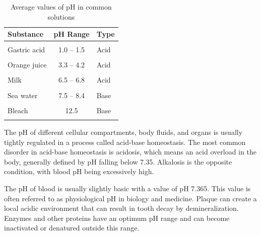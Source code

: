 \documentclass[
]{book}
\begin{document}
\begin{table}[!h]

\caption{\label{tab:solutions}Average values of pH in common solutions}
\centering
\begin{tabular}[t]{lcl}
\toprule
Substance & pH Range & Type\\
\midrule
\cellcolor{gray!6}{Battery acid} & \cellcolor{gray!6}{< 1} & \cellcolor{gray!6}{Acid}\\
Gastric acid & 1.0 – 1.5 & Acid\\
\cellcolor{gray!6}{Vinegar} & \cellcolor{gray!6}{2.5} & \cellcolor{gray!6}{Acid}\\
Orange juice & 3.3 – 4.2 & Acid\\
\cellcolor{gray!6}{Black coffee} & \cellcolor{gray!6}{5 – 5.03} & \cellcolor{gray!6}{Acid}\\
\addlinespace
Milk & 6.5 – 6.8 & Acid\\
\cellcolor{gray!6}{Pure water} & \cellcolor{gray!6}{7} & \cellcolor{gray!6}{Neutral}\\
Sea water & 7.5 – 8.4 & Base\\
\cellcolor{gray!6}{Ammonia} & \cellcolor{gray!6}{11.0 – 11.5} & \cellcolor{gray!6}{Base}\\
Bleach & 12.5 & Base\\
\addlinespace
\cellcolor{gray!6}{Lye} & \cellcolor{gray!6}{13.0 – 13.} & \cellcolor{gray!6}{Base}\\
\bottomrule
\end{tabular}
\end{table}

The pH of different cellular compartments, body fluids, and organs is usually tightly regulated in a process called acid-base homeostasis. The most common disorder in acid-base homeostasis is acidosis, which means an acid overload in the body, generally defined by pH falling below 7.35. Alkalosis is the opposite condition, with blood pH being excessively high.

The pH of blood is usually slightly basic with a value of pH 7.365. This value is often referred to as physiological pH in biology and medicine. Plaque can create a local acidic environment that can result in tooth decay by demineralization. Enzymes and other proteins have an optimum pH range and can become inactivated or denatured outside this range.
\end{document}
